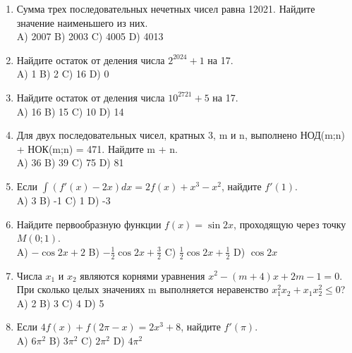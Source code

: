 \documentclass[12pt]{article}
\begin{document}
\begin{enumerate}
\item Сумма трех последовательных нечетных чисел равна 12021. Найдите значение наименьшего из них.
\\ A) 2007    
B) 2003    
C) 4005    
D) 4013
\vspace{4cm}

\item Найдите остаток от деления числа \( 2^{2024} + 1 \) на 17.
\\ A) 1    
B) 2    
C) 16    
D) 0
\vspace{4cm}

\item Найдите остаток от деления числа \( 10^{2721} + 5 \) на 17.
\\ A) 16    
B) 15    
C) 10    
D) 14
\vspace{4cm}

\item Для двух последовательных чисел, кратных 3, m и n, выполнено НОД(m;n) + НОК(m;n) = 471. Найдите m + n.
\\ A) 36    
B) 39    
C) 75    
D) 81
\vspace{4cm}

\item Если \( \int (f'(x) - 2x) dx = 2f(x) + x^3 - x^2 \), найдите \( f'(1) \).
\\ A) 3    
B) -1    
C) 1    
D) -3
\vspace{4cm}



\item Найдите первообразную функции \( f(x) = \sin 2x \), проходящую через точку \( M(0;1) \).
\\ A) \( -\cos 2x + 2 \)    
B) \( -\frac{1}{2} \cos 2x + \frac{3}{2} \)    
C) \( \frac{1}{2} \cos 2x + \frac{1}{2} \)    
D) \( \cos 2x \)
\vspace{4cm}

\item Числа \( x_1 \) и \( x_2 \) являются корнями уравнения \( x^2 - (m + 4)x + 2m - 1 = 0 \). При сколько целых значениях m выполняется неравенство \( x_1^2 x_2 + x_1 x_2^2 \leq 0 \)?
\\ A) 2    
B) 3    
C) 4    
D) 5
\vspace{4cm}

\item Если \( 4f(x) + f(2\pi - x) = 2x^3 + 8 \), найдите \( f'(\pi) \).
\\ A) \( 6\pi^2 \)    
B) \( 3\pi^2 \)    
C) \( 2\pi^2 \)    
D) \( 4\pi^2 \)
\vspace{4cm}


\end{enumerate}
\end{document}

